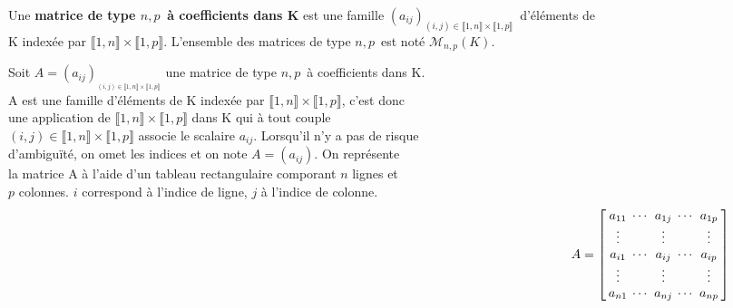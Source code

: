 Une \textbf{matrice de type $n,p\,$ à coefficients dans K} est une famille \((a_{ij})_{(i,j)\in \llbracket 1,n \rrbracket \times \llbracket 1,p \rrbracket }\,\) d'éléments de\vspace{0.2cm}\\
K indexée par \(\llbracket 1,n \rrbracket \times \llbracket 1,p \rrbracket\). L'ensemble des matrices de type $n,p\,$ est noté \(\mathcal{M}_{n,p}(K)\).\vspace{0.5cm}\\
\begin{small}
    Soit \(A= (a_{ij})_{_{(i,j)\in \llbracket 1,n \rrbracket \times \llbracket 1,p \rrbracket }}\) une matrice de type $n,p\,$ à coefficients dans K.\vspace{0.1cm}\\
    A est une famille d'éléments de K indexée par \(\llbracket 1,n \rrbracket \times \llbracket 1,p \rrbracket\), c'est donc \\
    une application de \(\llbracket 1,n \rrbracket \times \llbracket 1,p \rrbracket\) dans K qui à tout couple\\ 
    \((i,j)\in \llbracket 1,n \rrbracket \times \llbracket 1,p \rrbracket\) associe le scalaire \(a_{ij}\). Lorsqu'il n'y a pas de risque \\
    d'ambiguïté, on omet les indices et on note \(A=(a_{ij})\). On représente\\
    la matrice A à l'aide d'un tableau rectangulaire comporant $n$ lignes et \\
    $p$ colonnes. $i$ correspond à l'indice de ligne, $j$ à l'indice de colonne. \vspace{-3.3cm}
    \[\hspace{14cm} \arraycolsep=0.07cm\def\arraystretch{1}  A=\left[\begin{array}{ccccc}
        a_{11} & \cdots & a_{1j} & \cdots & a_{1p} \\
        \vdots & & \vdots & & \vdots \\
        a_{i1} & \cdots & a_{ij} & \cdots & a_{ip} \\
        \vdots & & \vdots & & \vdots \\
        a_{n1} & \cdots & a_{nj} & \cdots & a_{np} \\
    \end{array} \right]\]
\end{small}

\vspace{0.7cm}

